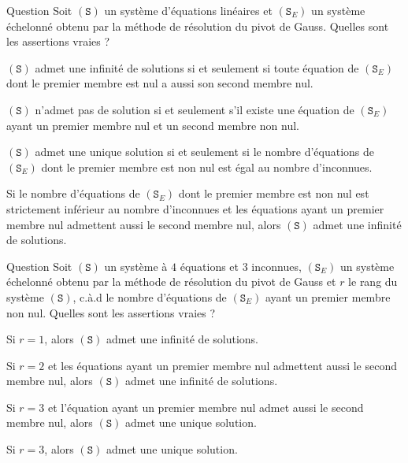 \begin{multi}[multiple,feedback=
{D'après la méthode du pivot de Gauss, \((\mathtt{S})\) admet une solution si et seulement si toute équation de \((\mathtt{S}_E)\) dont le premier membre est nul a aussi son second membre nul.
}]{Question}
Soit \((\mathtt{S})\) un système d'équations linéaires et \((\mathtt{S}_E)\) un système échelonné obtenu par la méthode de résolution du pivot de Gauss. Quelles sont les assertions vraies ?

    \item \((\mathtt{S})\) admet une infinité de solutions si et seulement si toute équation de \((\mathtt{S}_E)\) dont le premier membre est nul a aussi son second membre nul.
    \item* \((\mathtt{S})\) n'admet pas de solution si et seulement s'il existe une équation de \((\mathtt{S}_E)\) ayant un premier membre nul et un second membre non nul.
    \item \((\mathtt{S})\) admet une unique solution si et seulement si le nombre d'équations de \((\mathtt{S}_E)\) dont le premier membre est non nul est égal au nombre d'inconnues.
    \item* Si le nombre d'équations de \((\mathtt{S}_E)\) dont le premier membre est non nul est strictement inférieur au nombre d'inconnues et les équations ayant un premier membre nul admettent aussi le second membre nul, alors \((\mathtt{S})\) admet une infinité de solutions.
\end{multi}


\begin{multi}[multiple,feedback=
{D'après la méthode du pivot de Gauss, \((\mathtt{S})\) admet une solution si et seulement si toute équation de \((\mathtt{S}_E)\) dont le premier membre est nul a aussi son second membre nul.
}]{Question}
Soit \((\mathtt{S})\) un système à \(4\) équations et \(3\) inconnues, \((\mathtt{S}_E)\) un système échelonné obtenu par la méthode de résolution du pivot de Gauss et \(r\) le rang du système \((\mathtt{S})\), c.à.d le nombre d'équations de \((\mathtt{S}_E)\) ayant un premier membre non nul. Quelles sont les assertions vraies ?

    \item Si \(r=1\), alors \((\mathtt{S})\) admet une infinité de solutions.
    \item* Si \(r=2\) et les équations ayant un premier membre nul admettent aussi le second membre nul, alors \((\mathtt{S})\) admet une infinité de solutions.
    \item* Si \(r=3\) et l'équation ayant un premier membre nul admet aussi le second membre nul, alors \((\mathtt{S})\) admet une unique solution.
    \item Si \(r=3\), alors \((\mathtt{S})\) admet une unique solution.
\end{multi}


